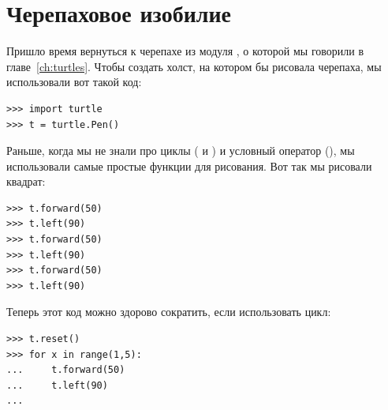 %
%
%

\chapter{Черепаховое изобилие}\label{ch:turtlesgalore}

Пришло время вернуться к черепахе из модуля , о которой мы говорили в главе \ref{ch:turtles}. Чтобы создать холст, на котором бы рисовала черепаха, мы использовали вот такой код:

\begin{listing}
\begin{verbatim}
>>> import turtle
>>> t = turtle.Pen()
\end{verbatim}
\end{listing}

Раньше, когда мы не знали про циклы ( и ) и условный оператор (), мы использовали самые простые функции для рисования. Вот так мы рисовали квадрат:

\begin{listing}
\begin{verbatim}
>>> t.forward(50)
>>> t.left(90)
>>> t.forward(50)
>>> t.left(90)
>>> t.forward(50)
>>> t.left(90)
\end{verbatim}
\end{listing} 

Теперь этот код можно здорово сократить, если использовать цикл:

\begin{listing}
\begin{verbatim}
>>> t.reset()
>>> for x in range(1,5):
...     t.forward(50)
...     t.left(90)
...
\end{verbatim}
\end{listing}

